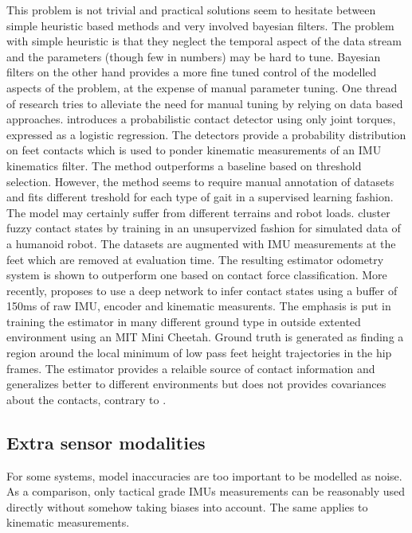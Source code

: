 This problem is not trivial and practical solutions seem to hesitate between simple heuristic based methods and very involved bayesian filters. 
The problem with simple heuristic is that they neglect the temporal aspect of the data stream and the parameters (though few in numbers) may be hard to tune.
Bayesian filters on the other hand provides a more fine tuned control of the modelled aspects of the problem, at the expense of manual parameter tuning.
One thread of research tries to alleviate the need for manual tuning by relying on data based approaches. \cite{camurri2017probabilistic} introduces a probabilistic 
contact detector using only joint torques, expressed as a logistic regression. The detectors provide a probability distribution on feet contacts which is used to ponder kinematic
measurements of an IMU kinematics filter. The method outperforms a baseline based on threshold selection. However, the method seems to require manual annotation of datasets and 
fits different treshold for each type of gait in a supervised learning fashion. The model may certainly suffer from different terrains and robot loads. 
\cite{rotella2018unsupervised} cluster fuzzy contact states by training in an unsupervized fashion for simulated data of a humanoid robot. The datasets are augmented
with IMU measurements at the feet which are removed at evaluation time. The resulting estimator odometry system is shown to outperform one based on contact force classification.
More recently, \cite{lin2021deep} proposes to use a deep network to infer contact states using a buffer of 150ms of raw IMU, encoder and kinematic measurents. 
The emphasis is put in training the estimator in many different ground type in outside extented environment using an MIT Mini Cheetah. Ground truth is generated
as finding a region around the local minimum of low pass feet height trajectories in the hip frames. The estimator provides a relaible source of contact information 
and generalizes better to different environments but does not provides covariances about the contacts, contrary to \cite{camurri2017probabilistic}.  


\subsection{Extra sensor modalities}
For some systems, model inaccuracies are too important to be modelled as noise. As a comparison, only tactical grade IMUs measurements
can be reasonably used directly without somehow taking biases into account. The same applies to kinematic measurements. 

